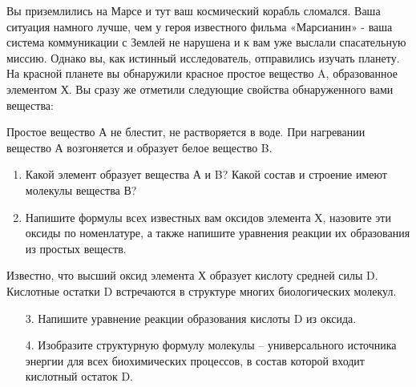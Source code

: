
Вы приземлились на Марсе и тут ваш космический корабль сломался. Ваша ситуация намного лучше, 
чем у героя известного фильма «Марсианин» - ваша система коммуникации с Землей не нарушена и к вам 
уже выслали спасательную миссию. Однако вы, как истинный исследователь, отправились изучать планету. 
На красной планете вы обнаружили красное простое вещество A, образованное элементом Х. Вы сразу же отметили 
следующие свойства обнаруженного вами вещества:

Простое вещество А не блестит, не растворяется в воде. При нагревании вещество А возгоняется и 
образует белое вещество B.

\begin{enumerate}
    \item Какой элемент образует вещества А и B? Какой состав и строение имеют молекулы вещества В?
    \item Напишите формулы всех известных вам оксидов элемента Х, назовите эти оксиды по номенлатуре, а также напишите уравнения реакции их образования из простых веществ.
\end{enumerate}

Известно, что высший оксид элемента Х образует кислоту средней силы D. Кислотные остатки D встречаются в структуре многих биологических молекул. 

\begin{enumerate}
    \item[3.] Напишите уравнение реакции образования кислоты D из оксида.
    \item[4.] Изобразите структурную формулу молекулы – универсального источника энергии для всех биохимических процессов, в состав которой входит кислотный остаток D.
\end{enumerate}